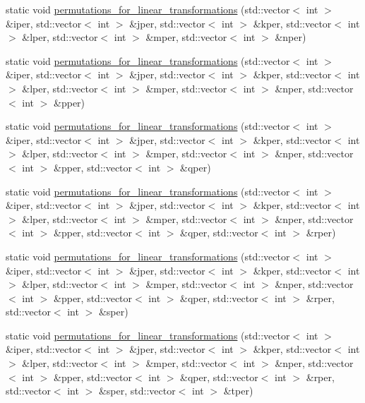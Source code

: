 \begin{DoxyCompactItemize}
static void \mbox{\hyperlink{namespacempc_1_1transformation_a36b74334064f0321f1c82125af19e793}{permutations\+\_\+for\+\_\+linear\+\_\+transformations}} (std\+::vector$<$ int $>$ \&iper, std\+::vector$<$ int $>$ \&jper, std\+::vector$<$ int $>$ \&kper, std\+::vector$<$ int $>$ \&lper, std\+::vector$<$ int $>$ \&mper, std\+::vector$<$ int $>$ \&nper)
\item 
static void \mbox{\hyperlink{namespacempc_1_1transformation_a3a0c8c6aeded9339e6081b2a13e206c1}{permutations\+\_\+for\+\_\+linear\+\_\+transformations}} (std\+::vector$<$ int $>$ \&iper, std\+::vector$<$ int $>$ \&jper, std\+::vector$<$ int $>$ \&kper, std\+::vector$<$ int $>$ \&lper, std\+::vector$<$ int $>$ \&mper, std\+::vector$<$ int $>$ \&nper, std\+::vector$<$ int $>$ \&pper)
\item 
static void \mbox{\hyperlink{namespacempc_1_1transformation_a7555c5fbc163dc940865b99ae19de002}{permutations\+\_\+for\+\_\+linear\+\_\+transformations}} (std\+::vector$<$ int $>$ \&iper, std\+::vector$<$ int $>$ \&jper, std\+::vector$<$ int $>$ \&kper, std\+::vector$<$ int $>$ \&lper, std\+::vector$<$ int $>$ \&mper, std\+::vector$<$ int $>$ \&nper, std\+::vector$<$ int $>$ \&pper, std\+::vector$<$ int $>$ \&qper)
\item 
static void \mbox{\hyperlink{namespacempc_1_1transformation_a8766b836a604c8da92cb7c03db68abb4}{permutations\+\_\+for\+\_\+linear\+\_\+transformations}} (std\+::vector$<$ int $>$ \&iper, std\+::vector$<$ int $>$ \&jper, std\+::vector$<$ int $>$ \&kper, std\+::vector$<$ int $>$ \&lper, std\+::vector$<$ int $>$ \&mper, std\+::vector$<$ int $>$ \&nper, std\+::vector$<$ int $>$ \&pper, std\+::vector$<$ int $>$ \&qper, std\+::vector$<$ int $>$ \&rper)
\item 
static void \mbox{\hyperlink{namespacempc_1_1transformation_afd11ba1dd700163123c9bca5fac99751}{permutations\+\_\+for\+\_\+linear\+\_\+transformations}} (std\+::vector$<$ int $>$ \&iper, std\+::vector$<$ int $>$ \&jper, std\+::vector$<$ int $>$ \&kper, std\+::vector$<$ int $>$ \&lper, std\+::vector$<$ int $>$ \&mper, std\+::vector$<$ int $>$ \&nper, std\+::vector$<$ int $>$ \&pper, std\+::vector$<$ int $>$ \&qper, std\+::vector$<$ int $>$ \&rper, std\+::vector$<$ int $>$ \&sper)
\item 
static void \mbox{\hyperlink{namespacempc_1_1transformation_a355316f26f98f04d0cc528e7417e1d9e}{permutations\+\_\+for\+\_\+linear\+\_\+transformations}} (std\+::vector$<$ int $>$ \&iper, std\+::vector$<$ int $>$ \&jper, std\+::vector$<$ int $>$ \&kper, std\+::vector$<$ int $>$ \&lper, std\+::vector$<$ int $>$ \&mper, std\+::vector$<$ int $>$ \&nper, std\+::vector$<$ int $>$ \&pper, std\+::vector$<$ int $>$ \&qper, std\+::vector$<$ int $>$ \&rper, std\+::vector$<$ int $>$ \&sper, std\+::vector$<$ int $>$ \&tper)
\end{DoxyCompactItemize}


